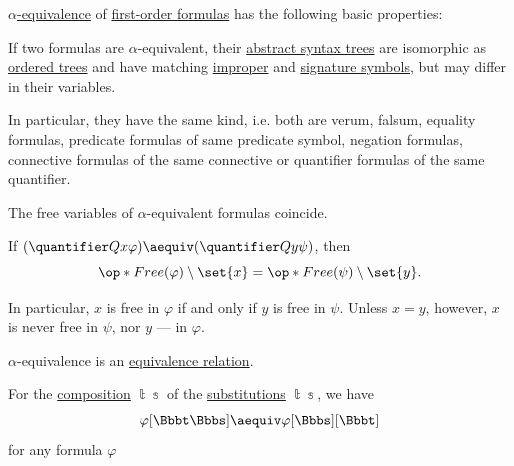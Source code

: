 \begin{proposition}\label{thm:def:fol_formula_alpha_equivalence}
  \hyperref[thm:def:fol_formula_alpha_equivalence]{\( \alpha \)-equivalence} of \hyperref[def:fol_formula]{first-order formulas} has the following basic properties:
  \begin{thmenum}
     If two formulas are \( \alpha \)-equivalent, their \hyperref[def:fol_formula_ast]{abstract syntax trees} are isomorphic as \hyperref[def:ordered_tree]{ordered trees} and have matching \hyperref[def:predicate_logic_alphabet]{improper} and \hyperref[def:fol_signature]{signature symbols}, but may differ in their variables.

    In particular, they have the same kind, i.e. both are verum, falsum, equality formulas, predicate formulas of same predicate symbol, negation formulas, connective formulas of the same connective or quantifier formulas of the same quantifier.

     The free variables of \( \alpha \)-equivalent formulas coincide.

     If \( (\quantifier Q x \varphi) \aequiv (\quantifier Q y \psi) \), then
    \begin{equation}\label{eq:thm:def:fol_formula_alpha_equivalence/abstraction_body_free}
      \op*{Free}(\varphi) \setminus \set{ x } = \op*{Free}(\psi) \setminus \set{ y }.
    \end{equation}

    In particular, \( x \) is free in \( \varphi \) if and only if \( y \) is free in \( \psi \). Unless \( x = y \), however, \( x \) is never free in \( \psi \), nor \( y \) --- in \( \varphi \).

     \( \alpha \)-equivalence is an \hyperref[def:equivalence_relation]{equivalence relation}.

     For the \hyperref[def:fol_substitution_composition]{composition} \( \Bbbt \Bbbs \) of the \hyperref[def:atomic_fol_substitution]{substitutions} \( \Bbbt \Bbbs \), we have
    \begin{equation}\label{eq:thm:def:fol_formula_alpha_equivalence/composition}
      \varphi[\Bbbt\Bbbs] \aequiv \varphi[\Bbbs][\Bbbt]
    \end{equation}
    for any formula \( \varphi \)


\end{thmenum}
\end{proposition}
